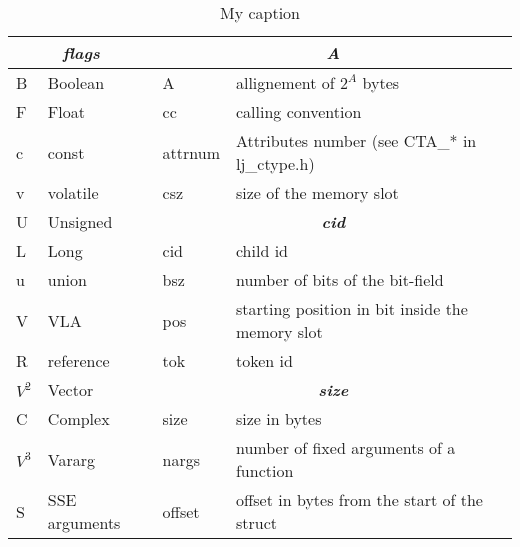 \begin{table}[H]
\footnotesize
\centering
\caption{My caption}
\label{tab:ffi-ctype2}
\begin{tabular}{ll|l|l|}
\hline
\multicolumn{2}{|c|}{\textit{\textbf{flags}}} & \multicolumn{2}{c|}{\textit{\textbf{A}}}                                    \\ \hline
\multicolumn{1}{|l|}{B}      & Boolean        & A                      & allignement of $2^A$ bytes                         \\
\multicolumn{1}{|l|}{F}      & Float          & cc                     & calling convention                                 \\
\multicolumn{1}{|l|}{c}      & const          & attrnum                & Attributes number (see CTA\_* in lj\_ctype.h)      \\
\multicolumn{1}{|l|}{v}      & volatile       & csz                    & size of the memory slot                            \\ \cline{3-4}
\multicolumn{1}{|l|}{U}      & Unsigned       & \multicolumn{2}{c|}{\textit{\textbf{cid}}}                                  \\ \cline{3-4}
\multicolumn{1}{|l|}{L}      & Long           & cid                    & child id                                           \\
\multicolumn{1}{|l|}{u}      & union          & bsz                    & number of bits of the bit-field                    \\
\multicolumn{1}{|l|}{V}      & VLA            & pos                    & starting position in bit inside the memory slot    \\
\multicolumn{1}{|l|}{R}      & reference      & tok                    & token id                                           \\ \cline{3-4}
\multicolumn{1}{|l|}{$V^2$}  & Vector         & \multicolumn{2}{c|}{\textit{\textbf{size}}}                                 \\ \cline{3-4}
\multicolumn{1}{|l|}{C}      & Complex        & size                   & size in bytes                                      \\
\multicolumn{1}{|l|}{$V^3$}  & Vararg         & nargs                  & number of fixed arguments of a function            \\
\multicolumn{1}{|l|}{S}      & SSE arguments  & offset                 & offset in bytes from the start of the struct       \\ \cline{1-2}

\end{tabular}
\end{table}
